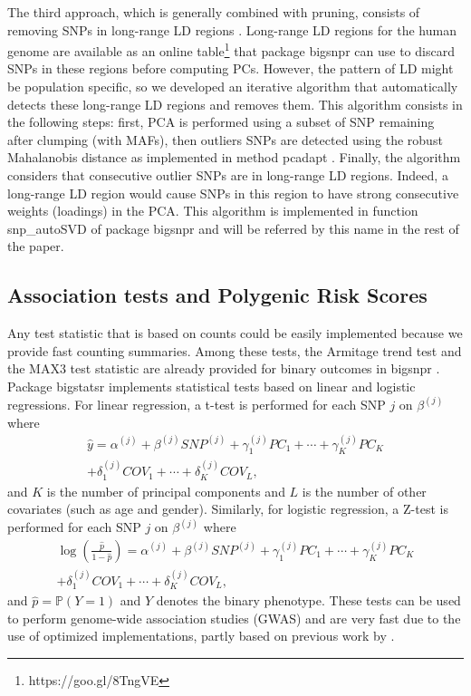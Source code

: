 \documentclass{bioinfo}
\begin{document}
\begin{methods}
The third approach, which is generally combined with pruning, consists of removing SNPs in long-range LD regions \cite[]{Price2008}. Long-range LD regions for the human genome are available as an online table\footnote{https://goo.gl/8TngVE} that package bigsnpr can use to discard SNPs in these regions before computing PCs. 
However, the pattern of LD might be population specific, so we developed an iterative algorithm that automatically detects these long-range LD regions and removes them. This algorithm consists in the following steps: first, PCA is performed using a subset of SNP remaining after clumping (with MAFs), then outliers SNPs are detected using the robust Mahalanobis distance as implemented in method pcadapt \cite[]{Luu2017}. Finally, the algorithm considers that consecutive outlier SNPs are in long-range LD regions. Indeed, a long-range LD region would cause SNPs in this region to have strong consecutive weights (loadings) in the PCA. This algorithm is implemented in function snp\_autoSVD of package bigsnpr and will be referred by this name in the rest of the paper.


\subsection{Association tests and Polygenic Risk Scores}

Any test statistic that is based on counts could be easily implemented because we provide fast counting summaries. Among these tests, the Armitage trend test and the MAX3 test statistic are already provided for binary outcomes in bigsnpr \cite[]{Zheng2012}. 
Package bigstatsr implements statistical tests based on linear and logistic regressions. For linear regression, a t-test is performed for each SNP $j$ on $\beta^{(j)}$ where
\begin{multline}
  \hat{y} = \alpha^{(j)} + \beta^{(j)} SNP^{(j)} + \gamma_1^{(j)} PC_1 + \cdots + \gamma_K^{(j)} PC_K \\ + \delta_1^{(j)} COV_1 + \cdots + \delta_K^{(j)} COV_L,
\end{multline}
and $K$ is the number of principal components and $L$ is the number of other covariates (such as age and gender). Similarly, for logistic regression, a Z-test is performed for each SNP $j$ on $\beta^{(j)}$ where
\begin{multline}
  \log{\left(\frac{\hat{p}}{1-\hat{p}}\right)} = \alpha^{(j)} + \beta^{(j)} SNP^{(j)} + \gamma_1^{(j)} PC_1 + \cdots + \gamma_K^{(j)} PC_K \\ + \delta_1^{(j)} COV_1 + \cdots + \delta_K^{(j)} COV_L,
\end{multline}
and $\hat{p} = \mathbb{P}(Y = 1)$ and $Y$ denotes the binary phenotype.
These tests can be used to perform genome-wide association studies (GWAS) and are very fast due to the use of optimized implementations, partly based on previous work by \cite{sikorska2013gwas}. 


\end{methods}
\end{document}
